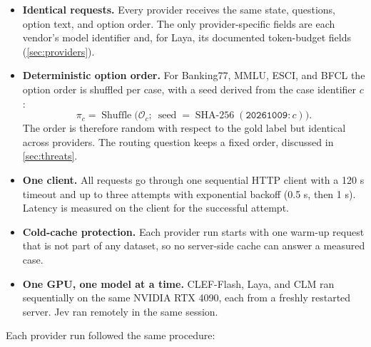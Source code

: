 \documentclass[11pt,a4paper]{article}
\begin{document}
\begin{itemize}
  \item \textbf{Identical requests.} Every provider receives the same state, questions, option text,
        and option order. The only provider-specific fields are each vendor's model identifier and,
        for Laya, its documented token-budget fields (\cref{sec:providers}).
  \item \textbf{Deterministic option order.} For Banking77, MMLU, ESCI, and BFCL the option order is
        shuffled per case, with a seed derived from the case identifier $c$:
        \begin{equation}\label{eq:shuffle}
          \pi_c = \operatorname{Shuffle}\bigl(\mathcal{O}_c;\ \operatorname{seed} = \operatorname{SHA-256}(\texttt{20261009:}\,c)\bigr).
        \end{equation}
        The order is therefore random with respect to the gold label but identical across providers.
        The routing question keeps a fixed order, discussed in \cref{sec:threats}.
  \item \textbf{One client.} All requests go through one sequential HTTP client with a 120 s timeout
        and up to three attempts with exponential backoff (0.5 s, then 1 s). Latency is measured on
        the client for the successful attempt.
  \item \textbf{Cold-cache protection.} Each provider run starts with one warm-up request that is not
        part of any dataset, so no server-side cache can answer a measured case.
  \item \textbf{One GPU, one model at a time.} CLEF-Flash, Laya, and CLM ran sequentially on the same
        NVIDIA RTX 4090, each from a freshly restarted server. Jev ran remotely in the same session.
\end{itemize}

Each provider run followed the same procedure:

\begin{steps}
\end{steps}
\end{document}
